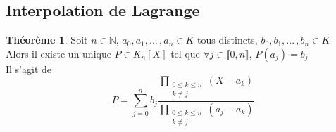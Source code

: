 \documentclass[10pt,a4paper]{article}
\theoremstyle{definition}
\newtheorem{theorem}[proposition]{Théorème}
\begin{document}
\subsection{Interpolation de Lagrange}
\begin{theorem}
Soit $n \in \mathbb{N}$, $a_0, a_1, ...\,, a_n \in K$ tous distincts, $b_0, b_1, ...\,, b_n \in K$ \\
Alors il existe un unique $P \in K_n[X]$ tel que $\forall j \in \llbracket 0, n \rrbracket$, $P(a_j) = b_j$ \\
Il s'agit de
\[ P = \sum_{j = 0}^n b_j \frac{\prod\limits_{\substack{0 \leq k \leq n \\ k \neq j}} (X - a_k)}{\prod\limits_{\substack{0 \leq k \leq n \\ k \neq j}} (a_j - a_k)} \]
\end{theorem}
\end{document}
